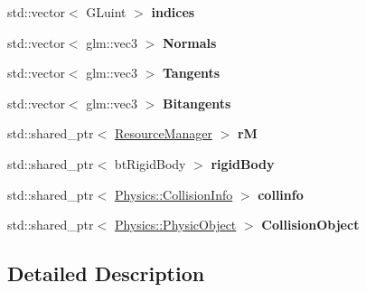 \begin{DoxyCompactItemize}
\item 
std\+::vector$<$ G\+Luint $>$ {\bfseries indices}\hypertarget{class_terrain_ad8ada99be8e666e8407562007a99fa8c}{}\label{class_terrain_ad8ada99be8e666e8407562007a99fa8c}

\item 
std\+::vector$<$ glm\+::vec3 $>$ {\bfseries Normals}\hypertarget{class_terrain_a95c393e7d83331da0a58918c579a0768}{}\label{class_terrain_a95c393e7d83331da0a58918c579a0768}

\item 
std\+::vector$<$ glm\+::vec3 $>$ {\bfseries Tangents}\hypertarget{class_terrain_abf5870deb992df26119b3913368fc944}{}\label{class_terrain_abf5870deb992df26119b3913368fc944}

\item 
std\+::vector$<$ glm\+::vec3 $>$ {\bfseries Bitangents}\hypertarget{class_terrain_a6fbe9cd7e312c34b737222df1781e951}{}\label{class_terrain_a6fbe9cd7e312c34b737222df1781e951}

\item 
std\+::shared\+\_\+ptr$<$ \hyperlink{class_resource_manager}{Resource\+Manager} $>$ {\bfseries rM}\hypertarget{class_terrain_a2f445a86dc4e85883fd0e141b7122313}{}\label{class_terrain_a2f445a86dc4e85883fd0e141b7122313}

\item 
std\+::shared\+\_\+ptr$<$ bt\+Rigid\+Body $>$ {\bfseries rigid\+Body}\hypertarget{class_terrain_a6b082f76ae038554041a4d465eb75dcd}{}\label{class_terrain_a6b082f76ae038554041a4d465eb75dcd}

\item 
std\+::shared\+\_\+ptr$<$ \hyperlink{class_physics_1_1_collision_info}{Physics\+::\+Collision\+Info} $>$ {\bfseries collinfo}\hypertarget{class_terrain_a07f5dd4d6e0b4bf03565fd4c029a7874}{}\label{class_terrain_a07f5dd4d6e0b4bf03565fd4c029a7874}

\item 
std\+::shared\+\_\+ptr$<$ \hyperlink{class_physics_1_1_physic_object}{Physics\+::\+Physic\+Object} $>$ {\bfseries Collision\+Object}\hypertarget{class_terrain_abda0cbfcde40e911a4b9ceccdd9e5b49}{}\label{class_terrain_abda0cbfcde40e911a4b9ceccdd9e5b49}

\end{DoxyCompactItemize}


\subsection{Detailed Description}


